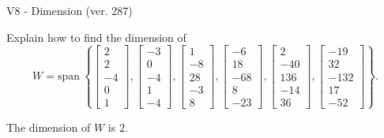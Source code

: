 \begin{exercise}
  \begin{exerciseTitle}V8 - Dimension (ver. 287)\end{exerciseTitle}
  \begin{exerciseStatement}
    Explain how to find the dimension of 
\[W=\mathrm{span}\ \left\{\left[\begin{array}{r}
2 \\
2 \\
-4 \\
0 \\
1
\end{array}\right] , \left[\begin{array}{r}
-3 \\
0 \\
-4 \\
1 \\
-4
\end{array}\right] , \left[\begin{array}{r}
1 \\
-8 \\
28 \\
-3 \\
8
\end{array}\right] , \left[\begin{array}{r}
-6 \\
18 \\
-68 \\
8 \\
-23
\end{array}\right] , \left[\begin{array}{r}
2 \\
-40 \\
136 \\
-14 \\
36
\end{array}\right] , \left[\begin{array}{r}
-19 \\
32 \\
-132 \\
17 \\
-52
\end{array}\right]\right\}.\]



  \end{exerciseStatement}
  \begin{exerciseAnswer}
   The dimension of \(W\) is  \(2\).
  


  \end{exerciseAnswer}
\end{exercise}